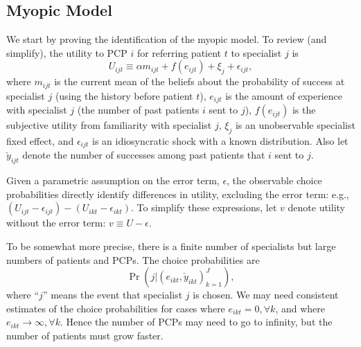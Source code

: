 \documentclass[12pt]{article}
\begin{document}
\subsection{Myopic Model}

We start by proving the identification of the myopic model.
To review (and simplify), the utility to PCP $i$ for referring patient $t$ to specialist $j$ is
\[
U_{ijt} \equiv \alpha m_{ijt} + f(e_{ijt}) + \xi_j + \epsilon_{ijt},
\]
where $m_{ijt}$ is the current mean of the beliefs about the probability of success at specialist $j$ (using the history before patient $t$), $e_{ijt}$ is the amount of experience with specialist $j$ (the number of past patients $i$ sent to $j$), $f(e_{ijt})$ is the subjective utility from familiarity with specialist $j$, $\xi_j$ is an unobservable specialist fixed effect, and $\epsilon_{ijt}$ is an idiosyncratic shock with a known distribution.
Also let $\check y_{ijt}$ denote the number of successes among past patients that $i$ sent to $j$.

Given a parametric assumption on the error term, $\epsilon$, the observable choice probabilities directly identify differences in utility, excluding the error term: e.g., $(U_{ijt} - \epsilon_{ijt}) - (U_{ikt} - \epsilon_{ikt})$.
To simplify these expressions, let $v$ denote utility without the error term: $v \equiv U - \epsilon$.

To be somewhat more precise, there is a finite number of specialists but large numbers of patients and PCPs.
The choice probabilities are
\[
\Pr(j | (e_{ikt}, \check y_{ikt})_{k=1}^J) ,
\]
where ``$j$'' means the event that specialist $j$ is chosen.
We may need consistent estimates of the choice probabilities for cases where $e_{ikt} = 0, \forall k$, and where $e_{ikt} \to \infty, \forall k$.
Hence the number of PCPs may need to go to infinity, but the number of patients must grow faster.
\end{document}
